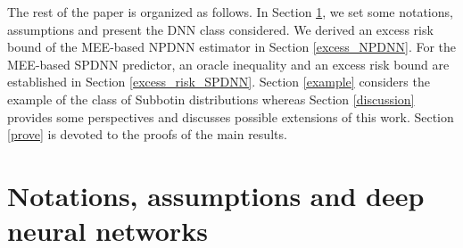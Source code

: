 \documentclass[10pt,twoside]{article}
\numberwithin{equation}{section}
\begin{document}
 
 

\medskip
The rest of the paper is organized as follows.
%
In Section \ref{asump}, we set some notations, assumptions and present the DNN class considered. 
%
 We derived an excess risk bound of the MEE-based NPDNN estimator in Section \ref{excess_NPDNN}. 
 For the MEE-based SPDNN predictor, an oracle inequality and an  excess risk bound are established in Section \ref{excess_risk_SPDNN}.
% 
%
Section \ref{example} considers the example of the class of Subbotin distributions whereas Section \ref{discussion} provides some perspectives and discusses possible extensions of this work.
%
Section \ref{prove} is devoted to the proofs of the main results.

  
\section{Notations, assumptions and deep neural networks}\label{asump}
%
\end{document}

